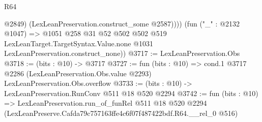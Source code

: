\begin{lexlean}{R64}
\begin{coremodule}
              @2849)
            (LexLeanPreservation.construct_some @2587))))
      (fun ("_" : @2132 @1047) =>
      @1051
        @258
        @31
        @52
        @502
        @502
        @519
        LexLeanTarget.TargetSyntax.Value.none
        @1031
        LexLeanPreservation.construct_none))
@3717 := LexLeanPreservation.Obs
@3718 := (bits : @10) -> @3717
@3727 := fun (bits : @10) =>
  cond.{1} @3717 @2286 (LexLeanPreservation.Obs.value @2293) LexLeanPreservation.Obs.overflow
@3733 := (bits : @10) -> LexLeanPreservation.RunConv @511 @18 @520 @2294
@3742 := fun (bits : @10) =>
  LexLeanPreservation.run_of_funRel
    @511
    @18
    @520
    @2294
    (LexLeanPreserve.Cafda79c757163ffe4c6f07f487422bdf.R64.__rel_0 @516)
\end{coremodule}
\end{lexlean}
